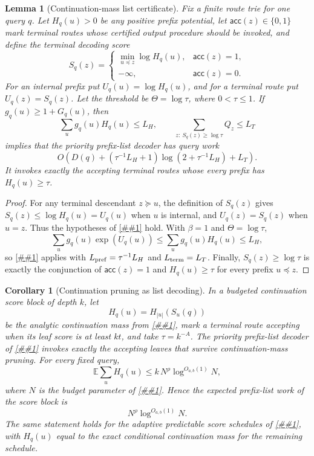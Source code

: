 \documentclass[10pt]{article}
\newcommand{\cref}[1]{\ref{##1}}
\newtheorem{lemma}[theorem]{Lemma}
\newtheorem{corollary}[theorem]{Corollary}
\theoremstyle{definition}
\newcommand{\E}{\mathbb{E}}
\begin{document}
\begin{lemma}[Continuation-mass list certificate]
   \label{lem:continuation-list-certificate}
   Fix a finite route trie for one query \(q\).  Let \(H_q(u)>0\) be any
   positive prefix potential, let \(\mathsf{acc}(z)\in\{0,1\}\) mark terminal
   routes whose certified output procedure should be invoked, and define the
   terminal decoding score
   \[
      S_q(z)=
      \begin{cases}
         \displaystyle \min_{u\preceq z}\log H_q(u),
            & \mathsf{acc}(z)=1,\\[0.6em]
         -\infty,& \mathsf{acc}(z)=0 .
      \end{cases}
   \]
   For an internal prefix put \(U_q(u)=\log H_q(u)\), and for a terminal route
   put \(U_q(z)=S_q(z)\).  Let the threshold be \(\Theta=\log\tau\), where
   \(0<\tau\le1\).  If \(g_q(u)\ge1+G_q(u)\), then
   \[
      \sum_u g_q(u)H_q(u)\le L_H,
      \qquad
      \sum_{z:\ S_q(z)\ge\log\tau}Q_z\le L_T
   \]
   implies that the priority prefix-list decoder has query work
   \[
      O\!\left(
         D(q)
         +(\tau^{-1}L_H+1)\log(2+\tau^{-1}L_H)
         +L_T
      \right).
   \]
   It invokes exactly the accepting terminal routes whose every prefix has
   \(H_q(u)\ge\tau\).
\end{lemma}

\begin{proof}
   For any terminal descendant \(z\succeq u\), the definition of \(S_q(z)\)
   gives \(S_q(z)\le\log H_q(u)=U_q(u)\) when \(u\) is internal, and
   \(U_q(z)=S_q(z)\) when \(u=z\).  Thus the hypotheses of
   \cref{lem:prefix-list-decoder} hold.  With \(\beta=1\) and
   \(\Theta=\log\tau\),
   \[
      \sum_u g_q(u)\exp(U_q(u))
      \le
      \sum_u g_q(u)H_q(u)
      \le L_H ,
   \]
   so \cref{cor:prefix-list-resources} applies with
   \(L_{\rm pref}=\tau^{-1}L_H\) and \(L_{\rm term}=L_T\).  Finally,
   \(S_q(z)\ge\log\tau\) is exactly the conjunction of \(\mathsf{acc}(z)=1\)
   and \(H_q(u)\ge\tau\) for every prefix \(u\preceq z\).
\end{proof}

\begin{corollary}[Continuation pruning as list decoding]
   \label{cor:continuation-as-list-decoding}
   In a budgeted continuation score block of depth \(k\), let
   \[
      H_q(u)=H_{|u|}(S_u(q))
   \]
   be the analytic continuation mass from \cref{lem:continuation-work}, mark a
   terminal route accepting when its leaf score is at least \(kt\), and take
   \(\tau=k^{-A}\).  The priority prefix-list decoder of
   \cref{lem:continuation-list-certificate} invokes exactly the accepting leaves
   that survive continuation-mass pruning.  For every fixed query,
   \[
      \E\sum_u H_q(u)
      \le
      k\,N^\rho\log^{O_{a,b}(1)}N,
   \]
   where \(N\) is the budget parameter of \cref{cor:budgeted-block}.  Hence the
   expected prefix-list work of the score block is
   \[
      N^\rho\log^{O_{a,b}(1)}N .
   \]
   The same statement holds for the adaptive predictable score schedules of
   \cref{lem:adaptive-continuation}, with \(H_q(u)\) equal to the exact
   conditional continuation mass for the remaining schedule.
\end{corollary}
\end{document}
